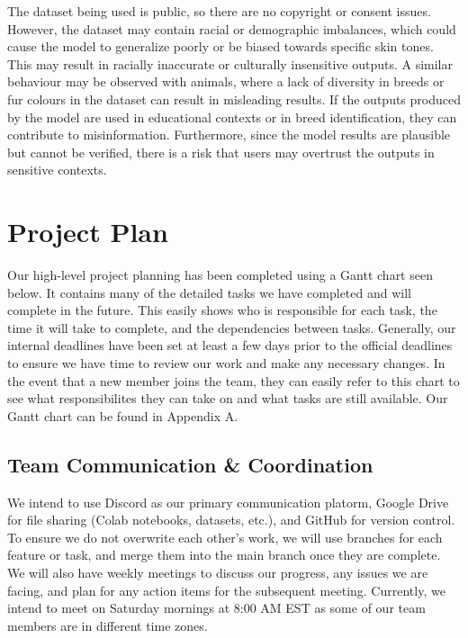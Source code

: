 \documentclass{article} %
\begin{document}
The dataset being used is public, so there are no copyright or consent issues. However, the dataset may contain racial or demographic imbalances, which could cause the model 
to generalize poorly or be biased towards specific skin tones. This may result in racially inaccurate or culturally insensitive outputs. A similar behaviour may be observed with 
animals, where a lack of diversity in breeds or fur colours in the dataset can result in misleading results. If the outputs produced by the model are used in educational contexts 
or in breed identification, they can contribute to misinformation. Furthermore, since the model results are plausible but cannot be verified, there is a risk that users may 
overtrust the outputs in sensitive contexts.

\section{Project Plan}
\label{project_plan}

Our high-level project planning has been completed using a Gantt chart seen below. It contains many of the detailed tasks we have completed and will complete in the future. This
easily shows who is responsible for each task, the time it will take to complete, and the dependencies between tasks. Generally, our internal deadlines have been set at least a 
few days prior to the official deadlines to ensure we have time to review our work and make any necessary changes. In the event that a new member joins the team, they can easily
refer to this chart to see what responsibilites they can take on and what tasks are still available. Our Gantt chart can be found in Appendix A.

\subsection{Team Communication \& Coordination}

We intend to use Discord as our primary communication platorm, Google Drive for file sharing (Colab notebooks, datasets, etc.), and GitHub for version control. To ensure we do 
not overwrite each other's work, we will use branches for each feature or task, and merge them into the main branch once they are complete. We will also have weekly meetings to
discuss our progress, any issues we are facing, and plan for any action items for the subsequent meeting. Currently, we intend to meet on Saturday mornings at 8:00 AM EST as some
of our team members are in different time zones.
\end{document}
